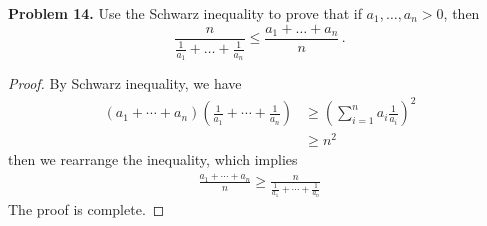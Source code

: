 \documentclass[12pt,leqno]{amsart}
\begin{document}
\medskip

\noindent
{\bf Problem 14.}
Use the Schwarz inequality to prove that if $a_1,\ldots,a_n>0$, then
$$
\frac{n}{\frac{1}{a_1}+\ldots+\frac{1}{a_n}}\leq \frac{a_1+\ldots+a_n}{n}\, .
$$

\begin{proof}
By Schwarz inequality, we have 
\begin{align*}
    (a_1 + \cdots + a_n)\left(\frac{1}{a_1} + \cdots + \frac{1}{a_n} \right) & \geq \left(\sum^n_{i=1}a_i \frac{1}{a_i} \right)^2 \\
    & \geq n^2
\end{align*}
then we rearrange the inequality, which implies 
\begin{align*}
    \frac{a_1 + \cdots + a_n}{n} \geq \frac{n}{\frac{1}{a_1} + \cdots + \frac{1}{a_n}}
\end{align*}
The proof is complete.
\end{proof}
\end{document}
